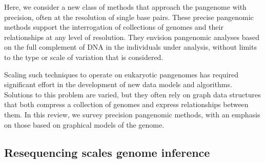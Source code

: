Here, we consider a new class of methods that approach the pangenome with precision, often at the resolution of single base pairs.
These precise pangenomic methods support the interrogation of collections of genomes and their relationships at any level of resolution.
They envision pangenomic analyses based on the full complement of DNA in the individuals under analysis, without limits to the type or scale of variation that is considered.

Scaling such techniques to operate on eukaryotic pangenomes has required significant effort in the development of new data models and algorithms.
Solutions to this problem are varied, but they often rely on graph data structures that both compress a collection of genomes and express relationships between them.
In this review, we survey precision pangenomic methods, with an emphasis on those based on graphical models of the genome.



\subsection{Resequencing scales genome inference}

